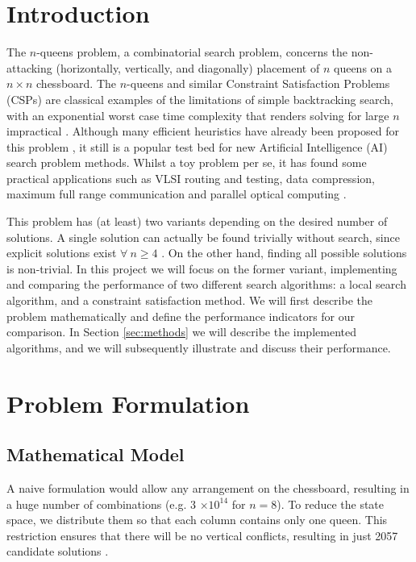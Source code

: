 \section{Introduction}

The $n$-queens problem, a combinatorial search problem, concerns the non-attacking (horizontally, vertically, and diagonally) placement of $n$ queens on a $n\times n$ chessboard. The $n$-queens and similar Constraint Satisfaction Problems (CSPs) are classical examples of the limitations of simple backtracking search, with an exponential worst case time complexity that renders solving for large $n$ impractical \citep{sosic90, backtracking}. Although many efficient heuristics have already been proposed for this problem \citep{sosic91, hu03, aima, engel07, agarwal12}, it still is a popular test bed for new Artificial Intelligence (AI) search problem methods. Whilst a toy problem per se, it has found some practical applications such as VLSI routing and testing, data compression, maximum full range communication and parallel optical computing \citep{sosic91, hu03}.

This problem has (at least) two variants depending on the desired number of solutions. A single solution can actually be found trivially without search, since explicit solutions exist $\forall \ n \ge 4$ \citep{trivial}. On the other hand, finding all possible solutions is non-trivial. In this project we will focus on the former variant, implementing and comparing the performance of two different search algorithms: a local search algorithm, and a constraint satisfaction method. We will first describe the problem mathematically and define the performance indicators for our comparison. In Section \ref{sec:methods} we will describe the implemented algorithms, and we will subsequently illustrate and discuss their performance.

\section{Problem Formulation}

\subsection{Mathematical Model}

A naive formulation would allow any arrangement on the chessboard, resulting in a huge number of combinations (e.g. 3 $\times 10^{14}$ for $n=8$). To reduce the state space, we distribute them so that each column contains only one queen. This restriction ensures that there will be no vertical conflicts, resulting in just 2057 candidate solutions \citep{aima}. 


